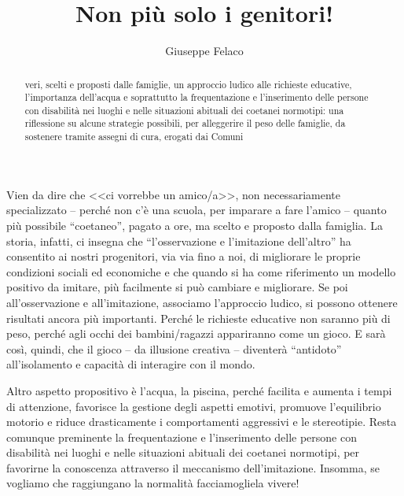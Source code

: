 \author{Giuseppe Felaco}
\title{Non più solo i genitori!}
\label{cha:felaco190413}
\begin{abstract}
 veri, scelti e proposti dalle famiglie, un approccio ludico alle richieste educative, l'importanza dell'acqua e soprattutto la frequentazione e l'inserimento delle persone con disabilità nei luoghi e nelle situazioni abituali dei coetanei normotipi: una riflessione su alcune strategie possibili, per alleggerire il peso delle famiglie, da sostenere tramite assegni di cura, erogati dai Comuni
\end{abstract}
\maketitle
{}
Vien da dire che <<ci vorrebbe un amico/a>>, non necessariamente specializzato – perché non c'è una scuola, per imparare a fare l'amico – quanto più possibile “coetaneo”, pagato a ore, ma scelto e proposto dalla famiglia.
La storia, infatti, ci insegna che “l'osservazione e l'imitazione dell'altro” ha consentito ai nostri progenitori, via via fino a noi, di migliorare le proprie condizioni sociali ed economiche e che quando si ha come riferimento un modello positivo da imitare, più facilmente si può cambiare e migliorare. Se poi all'osservazione e all'imitazione, associamo l'approccio ludico, si possono ottenere risultati ancora più importanti. Perché le richieste educative non saranno più di peso, perché agli occhi dei bambini/ragazzi appariranno come un gioco. E sarà così, quindi, che il gioco – da illusione creativa – diventerà “antidoto” all'isolamento e capacità di interagire con il mondo.

Altro aspetto propositivo è l'acqua, la piscina, perché facilita e aumenta i tempi di attenzione, favorisce la gestione degli aspetti emotivi, promuove l'equilibrio motorio e riduce drasticamente i comportamenti aggressivi e le stereotipie. Resta comunque preminente la frequentazione e l'inserimento delle persone con disabilità nei luoghi e nelle situazioni abituali dei coetanei normotipi, per favorirne la conoscenza attraverso il meccanismo dell'imitazione.
Insomma, se vogliamo che raggiungano la normalità facciamogliela vivere!

